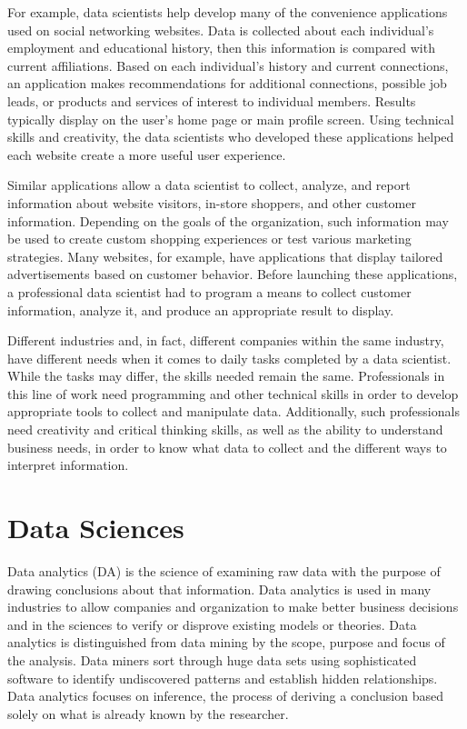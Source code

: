 \documentclass[]{report}
\begin{document}
For example, data scientists help develop many of the convenience applications used on social networking websites. Data is collected about each individual’s employment and educational history, then this information is compared with current affiliations. Based on each individual’s history and current connections, an application makes recommendations for additional connections, possible job leads, or products and services of interest to individual members. Results typically display on the user’s home page or main profile screen. Using technical skills and creativity, the data scientists who developed these applications helped each website create a more useful user experience.

Similar applications allow a data scientist to collect, analyze, and report information about website visitors, in-store shoppers, and other customer information. Depending on the goals of the organization, such information may be used to create custom shopping experiences or test various marketing strategies. Many websites, for example, have applications that display tailored advertisements based on customer behavior. Before launching these applications, a professional data scientist had to program a means to collect customer information, analyze it, and produce an appropriate result to display.

Different industries and, in fact, different companies within the same industry, have different needs when it comes to daily tasks completed by a data scientist. While the tasks may differ, the skills needed remain the same. Professionals in this line of work need programming and other technical skills in order to develop appropriate tools to collect and manipulate data. Additionally, such professionals need creativity and critical thinking skills, as well as the ability to understand business needs, in order to know what data to collect and the different ways to interpret information.

  \newpage
\section*{Data Sciences}
Data analytics (DA) is the science of examining raw data with the purpose of drawing conclusions about that information. Data analytics is used in many industries to allow companies and organization to make better business decisions and in the sciences to verify or disprove existing models or theories. Data analytics is distinguished from data mining by the scope, purpose and focus of the analysis. Data miners sort through huge data sets using sophisticated software to identify undiscovered patterns and establish hidden relationships. Data analytics focuses on inference, the process of deriving a conclusion based solely on what is already known by the researcher.
\end{document}
